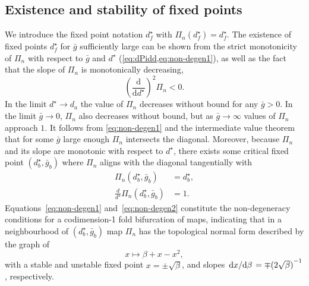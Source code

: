 \subsection{Existence and stability of fixed points}
We introduce the fixed point notation \(d^\star_{f}\) with \(\Pi_n(d^\star_{f})=d^\star_{f}\).
The existence of fixed points \(d^\star_{f}\) for \(\bar g\) sufficiently large can be shown from the strict monotonicity of \(\Pi_{n}\) with respect to \(\bar g\) and \(d^\star\) (\cref{eq:dPidd,eq:non-degen1}), as well as the fact that the slope of \(\Pi_{n}\) is monotonically decreasing,
\begin{equation}
	\label{eq:non-degen2}
	\left(\frac{\mathrm{d}}{\mathrm{d}d^\star}\right)^2 \Pi_n<0.
\end{equation}
In the limit \(d^\star \to d_{a}\) the value of \(\Pi_n\) decreases without bound for any \(\bar g>0\).
In the limit \(\bar g\to 0\), \(\Pi_n\) also decreases without bound, but as \(\bar g\to \infty\) values of \(\Pi_n\) approach \(1\).
It follows from \cref{eq:non-degen1} and the intermediate value theorem that for some \(\bar g\) large enough \(\Pi_n\) intersects the diagonal.
Moreover, because \(\Pi_n\) and its slope are monotonic with respect to \(d^\star\), there exists some critical fixed point \((d^\star_b, \bar g_b)\) where \(\Pi_n\) aligns with the diagonal tangentially with
\begin{align}
	\Pi_n(d^\star_b, \bar g_b)                  & =d^\star_b, \\
	\frac{d}{d^\star}\Pi_n(d^\star_b, \bar g_b) & =1.
\end{align}
Equations~\eqref{eq:non-degen1} and~\eqref{eq:non-degen2} constitute the non-degeneracy conditions for a codimension-1 fold bifurcation of maps, indicating that in a neighbourhood of \((d^\star_{b}, \bar g_{b})\) map \(\Pi_n\) has the topological normal form described by the graph of
\begin{equation}
	\label{eq:normal-form}
	x\mapsto \beta+x-x^{2},
\end{equation}
with a stable and unstable fixed point \(x=\pm\sqrt{\beta}\), and slopes \(\dv*{x}{\beta}=\mp {(2\sqrt{\beta})}^{-1}\), respectively.

